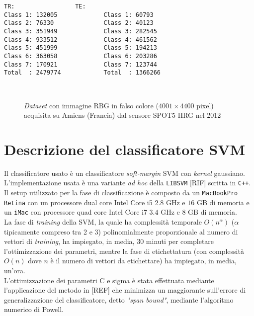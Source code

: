 \begin{lstlisting}[float=b,title={Distribuzione dei pixel di training e test classe per classe.},
                   label=lst:esempio, frame=lines]
TR:					TE:
Class 1: 132005				Class 1: 60793
Class 2: 76330				Class 2: 40123
Class 3: 351949				Class 3: 282545
Class 4: 933512				Class 4: 461562
Class 5: 451999				Class 5: 194213
Class 6: 363058				Class 6: 203286
Class 7: 170921				Class 7: 123744
Total  : 2479774			Total  : 1366266
\end{lstlisting}
\clearpage

\begin{figure}[!ht]
   \center
   \\%
     \hspace{4mm}
    \caption{\emph{Dataset} con immagine RBG in falso colore ($4001\times4400$ pixel) acquisita su Amiens (Francia) dal sensore \textsc{SPOT5 HRG} nel 2012}
    \label{fig: Amiens122_5m}
  \end{figure}
\clearpage

\section{Descrizione del classificatore SVM}
Il classificatore usato è un classificatore \emph{soft-margin} SVM con \emph{kernel} gaussiano. L'implementazione usata è una variante \emph{ad hoc} della \texttt{LIBSVM} [RIF] scritta in \texttt{C++}.\\
Il setup utilizzato per la fase di classificazione è composto da un \texttt{MacBookPro Retina} con un processore dual core Intel Core i5 $2.8$ GHz e $16$ GB di memoria e un \texttt{iMac} con processore quad core Intel Core i7 $3.4$ GHz e $8$ GB di memoria. \\

La fase di \emph{training} della SVM, la quale ha complessità temporale $O(n^\alpha)$ ($\alpha$ tipicamente compreso tra 2 e 3) polinomialmente proporzionale al numero di vettori di \emph{training}, ha impiegato, in media, 30 minuti per completare l'ottimizzazione dei parametri, mentre la fase di etichettatura (con complessità $O(n)$ dove $n$ è il numero di vettori da etichettare) ha impiegato, in media, un'ora.\\
L'ottimizzazione dei parametri C e sigma è stata effettuata mediante l'applicazione del metodo in [REF] che minimizza un maggiorante sull'errore di generalizzazione del classificatore, detto \emph{"span bound"}, mediante l'algoritmo numerico di Powell.


